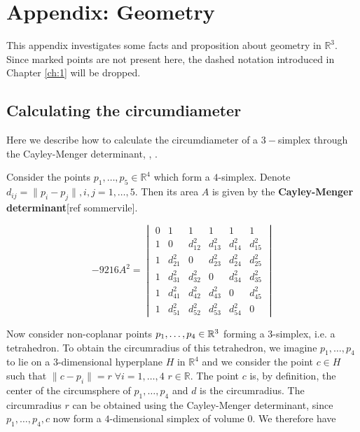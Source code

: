 \appendix

\chapter{Appendix: Geometry}\label{appendix}
This appendix investigates some facts and proposition about geometry in $\mathbb R^3$. Since marked points are not present here, the dashed notation introduced in Chapter \ref{ch:1} will be dropped.

\section{Calculating the circumdiameter}
Here we describe how to calculate the circumdiameter of a $3-$simplex through the Cayley-Menger determinant\cite{Cayley1841}, \cite{Menger28}, \cite{Uspensky48} .

Consider the points $p_1,\dots, p_5 \in \mathbb R^4$ which form a $4$-simplex. Denote $d_{ij} = \|p_i - p_j\|, i,j=1,\dots,5$. Then its area $A$ is given by the \textbf{Cayley-Menger determinant}[ref sommervile]. 

$$
-9216 A^2 =
\begin{vmatrix}
0 & 1 & 1 & 1 & 1 & 1 \\
1 & 0 & d^2_{12} & d^2_{13} & d^2_{14} & d^2_{15} \\
1 & d^2_{21} & 0 & d^2_{23} & d^2_{24} & d^2_{25}  \\
1 & d^2_{31} & d^2_{32} & 0 & d^2_{34} & d^2_{35} \\ 
1 & d^2_{41} & d^2_{42} & d^2_{43} & 0 & d^2_{45} \\
1 & d^2_{51} & d^2_{52} & d^2_{53} & d^2_{54} & 0 
\end{vmatrix} 
$$

Now consider non-coplanar points $p_1,\dots, p_4 \in {\mathbb R^3}$ forming a $3$-simplex, i.e. a tetrahedron. To obtain the circumradius of this tetrahedron, we imagine $p_1,\dots, p_4$ to lie on a $3$-dimensional hyperplane $H$ in $\mathbb R^4$ and we consider the point $c \in H$ such that $\|c-p_i\| = r \;\forall i=1,\dots,4$ $r\in \mathbb R$. The point $c$ is, by definition, the center of the circumsphere of $p_1,\dots,p_4$ and $d$ is the circumradius. The circumradius $r$ can be obtained using the Cayley-Menger determinant, since $p_1,\dots,p_4,c$ now form a $4$-dimensional simplex of volume $0$. We therefore have 


